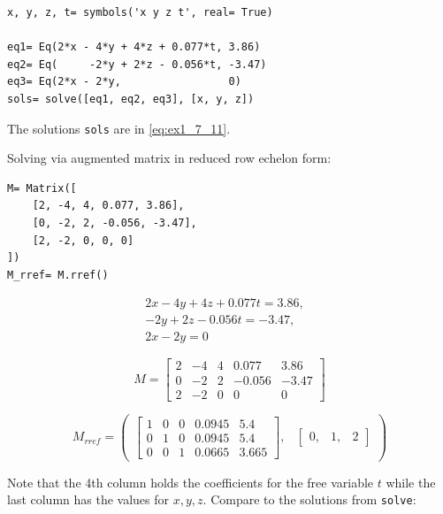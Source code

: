 \begin{verbatim}
x, y, z, t= symbols('x y z t', real= True)

eq1= Eq(2*x - 4*y + 4*z + 0.077*t, 3.86)
eq2= Eq(     -2*y + 2*z - 0.056*t, -3.47)
eq3= Eq(2*x - 2*y,                 0)
sols= solve([eq1, eq2, eq3], [x, y, z])
\end{verbatim}

The solutions \texttt{sols}  are in \ref{eq:ex1_7_11}.

Solving via augmented matrix in reduced row echelon form:

\begin{verbatim}
M= Matrix([
    [2, -4, 4, 0.077, 3.86],
    [0, -2, 2, -0.056, -3.47],
    [2, -2, 0, 0, 0]
])
M_rref= M.rref()
\end{verbatim}

\begin{equation}\label{eq:}
\begin{matrix}
2 x - 4 y + 4 z + 0.077 t= 3.86, & \\
- 2 y + 2 z - 0.056 t = -3.47, & \\
2 x - 2 y = 0\end{matrix}
\end{equation}

\begin{equation}\label{eq:}
M= \left[\begin{matrix}2 & -4 & 4 & 0.077 & 3.86\\0 & -2 & 2 & -0.056 & -3.47\\2 & -2 & 0 & 0 & 0\end{matrix}\right]
\end{equation}

\begin{equation}\label{eq:}
M_{rref} = \begin{pmatrix}\left[\begin{matrix}1 & 0 & 0 & 0.0945 & 5.4\\0 & 1 & 0 & 0.0945 & 5.4\\0 & 0 & 1 & 0.0665 & 3.665\end{matrix}\right], & \begin{bmatrix}0, & 1, & 2\end{bmatrix}\end{pmatrix}
\end{equation}

Note that the 4th column holds the coefficients for the free variable $t$ while the
last column has the values for $x, y, z$. Compare to the solutions
from \sympy \texttt{solve}:

